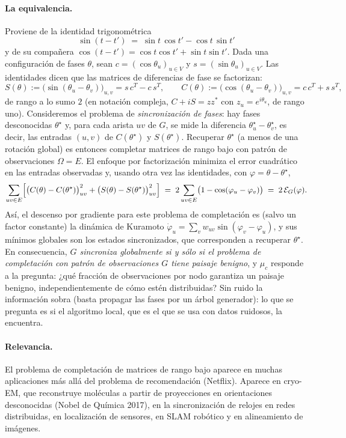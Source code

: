 \documentclass[11pt,a4paper]{article}
\begin{document}
\paragraph{La equivalencia.} Proviene de la identidad trigonométrica
\[
\sin(t-t') \;=\; \sin t\,\cos t' - \cos t\,\sin t'
\]
y de su compañera $\cos(t-t')=\cos t\cos t'+\sin t\sin t'$. Dada una configuración de fases $\theta$, sean $c=(\cos\theta_u)_{u\in V}$ y $s=(\sin\theta_u)_{u\in V}$. Las identidades dicen que las matrices de diferencias de fase se factorizan:
\[
S(\theta):=\bigl(\sin(\theta_u-\theta_v)\bigr)_{u,v}=s\,c^{T}-c\,s^{T},
\qquad
C(\theta):=\bigl(\cos(\theta_u-\theta_v)\bigr)_{u,v}=c\,c^{T}+s\,s^{T},
\]
de rango a lo sumo $2$ (en notación compleja, $C+iS=zz^*$ con $z_u=e^{i\theta_u}$, de rango uno). Consideremos el problema de \emph{sincronización de fases}: hay fases desconocidas $\theta^\star$ y, para cada arista $uv$ de $G$, se mide la diferencia $\theta^\star_u-\theta^\star_v$, es decir, las entradas $(u,v)$ de $C(\theta^\star)$ y $S(\theta^\star)$. Recuperar $\theta^\star$ (a menos de una rotación global) es entonces completar matrices de rango bajo con patrón de observaciones $\Omega=E$. El enfoque por factorización minimiza el error cuadrático en las entradas observadas y, usando otra vez las identidades, con $\varphi=\theta-\theta^\star$,
\[
\sum_{uv\in E}\Bigl[\bigl(C(\theta)-C(\theta^\star)\bigr)_{uv}^2+\bigl(S(\theta)-S(\theta^\star)\bigr)_{uv}^2\Bigr]
\;=\;2\sum_{uv\in E}\bigl(1-\cos(\varphi_u-\varphi_v)\bigr)\;=\;2\,\mathcal{E}_G(\varphi).
\]
Así, el descenso por gradiente para este problema de completación es (salvo un factor constante) la dinámica de Kuramoto $\dot\varphi_u=\sum_v w_{uv}\sin(\varphi_v-\varphi_u)$, y sus mínimos globales son los estados sincronizados, que corresponden a recuperar $\theta^\star$. En consecuencia, \emph{$G$ sincroniza globalmente si y sólo si el problema de completación con patrón de observaciones $G$ tiene paisaje benigno}, y $\mu_c$ responde a la pregunta: ¿qué fracción de observaciones por nodo garantiza un paisaje benigno, independientemente de cómo estén distribuidas? Sin ruido la información sobra (basta propagar las fases por un árbol generador): lo que se pregunta es si el algoritmo local, que es el que se usa con datos ruidosos, la encuentra.

\paragraph{Relevancia.} El problema de completación de matrices de rango bajo aparece en muchas aplicaciones más allá del problema de recomendación (Netflix). Aparece en cryo-EM, que reconstruye moléculas a partir de proyecciones en orientaciones desconocidas (Nobel de Química 2017), en la sincronización de relojes en redes distribuidas, en localización de sensores, en SLAM robótico y en alineamiento de imágenes.
\end{document}
